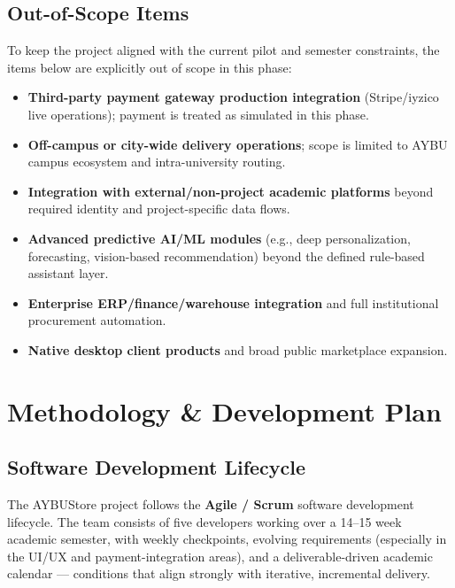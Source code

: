\documentclass[11pt,a4paper]{article}
\begin{document}
\subsection{Out-of-Scope Items}
To keep the project aligned with the current pilot and semester
constraints, the items below are explicitly out of scope in this phase:
\begin{itemize}[leftmargin=*]
    \item \textbf{Third-party payment gateway production integration}
    (Stripe/iyzico live operations); payment is treated as simulated in
    this phase.
    \item \textbf{Off-campus or city-wide delivery operations}; scope is
    limited to AYBU campus ecosystem and intra-university routing.
    \item \textbf{Integration with external/non-project academic
    platforms} beyond required identity and project-specific data flows.
    \item \textbf{Advanced predictive AI/ML modules} (e.g., deep
    personalization, forecasting, vision-based recommendation) beyond
    the defined rule-based assistant layer.
    \item \textbf{Enterprise ERP/finance/warehouse integration} and
    full institutional procurement automation.
    \item \textbf{Native desktop client products} and broad public
    marketplace expansion.
\end{itemize}

\section{Methodology \& Development Plan}
\label{sec:methodology}

\subsection{Software Development Lifecycle}
The AYBUStore project follows the \textbf{Agile / Scrum} software
development lifecycle. The team consists of five developers working
over a 14--15 week academic semester, with weekly checkpoints,
evolving requirements (especially in the UI/UX and payment-integration
areas), and a deliverable-driven academic calendar --- conditions that
align strongly with iterative, incremental delivery.
\end{document}
